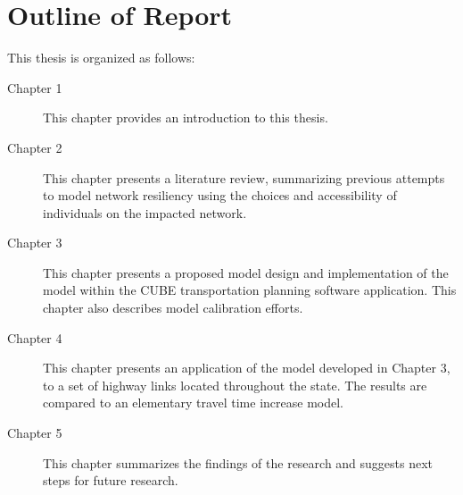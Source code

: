 \newpage
\section{Outline of Report}

\noindent This thesis is organized as follows:

\begin{description}
	\item [Chapter 1]	{This chapter provides an introduction to this thesis.}
	\item [Chapter 2]	{This chapter presents a literature review, summarizing previous attempts to model network resiliency using the choices and accessibility of individuals on the impacted network.}
	\item [Chapter 3]	{This chapter presents a proposed model design and implementation of the model within the CUBE transportation planning software application. This chapter also describes model calibration efforts.}
  \item [Chapter 4]	{This chapter presents an application of the model developed in Chapter 3, to a set of highway links located throughout the state. The results are compared to an elementary travel time increase model.}
	\item [Chapter 5]	{This chapter summarizes the findings of the research and suggests next steps for future research.}
\end{description}
